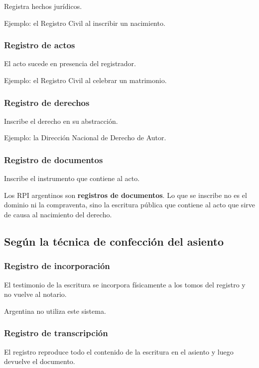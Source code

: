 \documentclass[12pt]{book}
\begin{document}
Registra hechos jur\'idicos.

Ejemplo: el Registro Civil al inscribir un nacimiento.

\subsubsection{Registro de actos}

El acto sucede en presencia del registrador.

Ejemplo: el Registro Civil al celebrar un matrimonio.

\subsubsection{Registro de derechos}

Inscribe el derecho en su abstracci\'on.

Ejemplo: la Direcci\'on Nacional de Derecho de Autor.

\subsubsection{Registro de documentos}

Inscribe el instrumento que contiene al acto.

Los RPI argentinos son \textbf{registros de documentos}. Lo que se inscribe no es el dominio ni la compraventa, sino la escritura p\'ublica que contiene al acto que sirve de causa al nacimiento del derecho.

\subsection{Seg\'un la t\'ecnica de confecci\'on del asiento}

\subsubsection{Registro de incorporaci\'on}

El testimonio de la escritura se incorpora f\'isicamente a los tomos del registro y no vuelve al notario.

Argentina no utiliza este sistema.

\subsubsection{Registro de transcripci\'on}

El registro reproduce todo el contenido de la escritura en el asiento y luego devuelve el documento.
\end{document}
